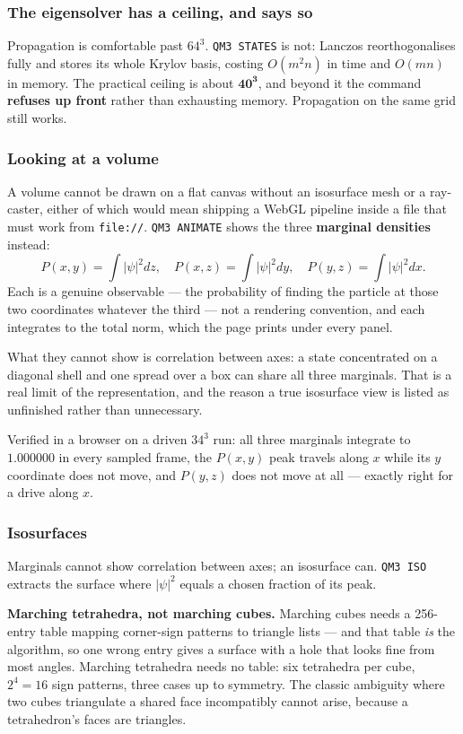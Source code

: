 \documentclass[11pt]{article}
\newcommand{\code}[1]{\texttt{#1}}
\begin{document}
\subsubsection*{The eigensolver has a ceiling, and says so}

Propagation is comfortable past $64^3$. \code{QM3 STATES} is not:
Lanczos reorthogonalises fully and stores its whole Krylov basis,
costing $O(m^2 n)$ in time and $O(mn)$ in memory. The practical ceiling
is about $\mathbf{40^3}$, and beyond it the command \textbf{refuses up
front} rather than exhausting memory. Propagation on the same grid still
works.

\subsubsection*{Looking at a volume}

A volume cannot be drawn on a flat canvas without an isosurface mesh or
a ray-caster, either of which would mean shipping a WebGL pipeline
inside a file that must work from \code{file://}. \code{QM3 ANIMATE}
shows the three \textbf{marginal densities} instead:
\[
  P(x,y)=\!\int\!|\psi|^2 dz,\quad
  P(x,z)=\!\int\!|\psi|^2 dy,\quad
  P(y,z)=\!\int\!|\psi|^2 dx .
\]
Each is a genuine observable --- the probability of finding the particle
at those two coordinates whatever the third --- not a rendering
convention, and each integrates to the total norm, which the page prints
under every panel.

What they cannot show is correlation between axes: a state concentrated
on a diagonal shell and one spread over a box can share all three
marginals. That is a real limit of the representation, and the reason a
true isosurface view is listed as unfinished rather than unnecessary.

Verified in a browser on a driven $34^3$ run: all three marginals
integrate to $1.000000$ in every sampled frame, the $P(x,y)$ peak travels
along $x$ while its $y$ coordinate does not move, and $P(y,z)$ does not
move at all --- exactly right for a drive along $x$.

\subsubsection*{Isosurfaces}

Marginals cannot show correlation between axes; an isosurface can.
\code{QM3 ISO} extracts the surface where $|\psi|^2$ equals a chosen
fraction of its peak.

\textbf{Marching tetrahedra, not marching cubes.} Marching cubes needs a
256-entry table mapping corner-sign patterns to triangle lists --- and
that table \emph{is} the algorithm, so one wrong entry gives a surface
with a hole that looks fine from most angles. Marching tetrahedra needs
no table: six tetrahedra per cube, $2^4=16$ sign patterns, three cases up
to symmetry. The classic ambiguity where two cubes triangulate a shared
face incompatibly cannot arise, because a tetrahedron's faces are
triangles.
\end{document}
